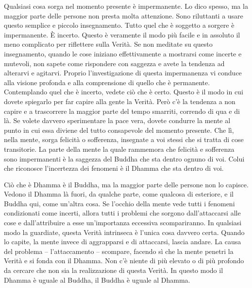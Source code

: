 Qualsiasi cosa sorga nel momento presente è impermanente. Lo dico
spesso, ma la maggior parte delle persone non presta molta attenzione.
Sono riluttanti a usare questo semplice e piccolo insegnamento. Tutto
quel che è soggetto a sorgere è impermanente. È incerto. Questo è
veramente il modo più facile e in assoluto il meno complicato per
riflettere sulla Verità. Se non meditate su questo insegnamento, quando
le cose iniziano effettivamente a mostrarsi come incerte e mutevoli, non
sapete come rispondere con saggezza e avete la tendenza ad alterarvi e
agitarvi. Proprio l'investigazione di questa impermanenza vi conduce
alla visione profonda e alla comprensione di quello che è permanente.
Contemplando quel che è incerto, vedete ciò che è certo. Questo è il
modo in cui dovete spiegarlo per far capire alla gente la Verità. Però
c'è la tendenza a non capire e a trascorrere la maggior parte del tempo
smarriti, correndo di qua e di là. Se volete davvero sperimentare la
pace vera, dovete condurre la mente al punto in cui essa diviene del
tutto consapevole del momento presente. Che lì, nella mente, sorga
felicità o sofferenza, insegnate a voi stessi che si tratta di cose
transitorie. La parte della mente la quale rammemora che felicità e
sofferenza sono impermanenti è la saggezza del Buddha che sta dentro
ognuno di voi. Colui che riconosce l'incertezza dei fenomeni è il Dhamma
che sta dentro di voi.

Ciò che è Dhamma è il Buddha, ma la maggior parte delle persone non lo
capisce. Vedono il Dhamma là fuori, da qualche parte, come qualcosa di
esteriore, e il Buddha qui, come un'altra cosa. Se l'occhio della mente
vede tutti i fenomeni condizionati come incerti, allora tutti i problemi
che sorgono dall'attaccarsi alle cose e dall'attribuire a esse
un'importanza eccessiva scompariranno. In qualsiasi modo la guardiate,
questa Verità intrinseca è l'unica cosa davvero certa. Quando lo capite,
la mente invece di aggrapparsi e di attaccarsi, lascia andare. La causa
del problema -- l'attaccamento -- scompare, facendo sì che la mente
penetri la Verità e si fonda con il Dhamma. Non c'è niente di più
elevato o di più profondo da cercare che non sia la realizzazione di
questa Verità. In questo modo il Dhamma è uguale al Buddha, il Buddha è
uguale al Dhamma.

